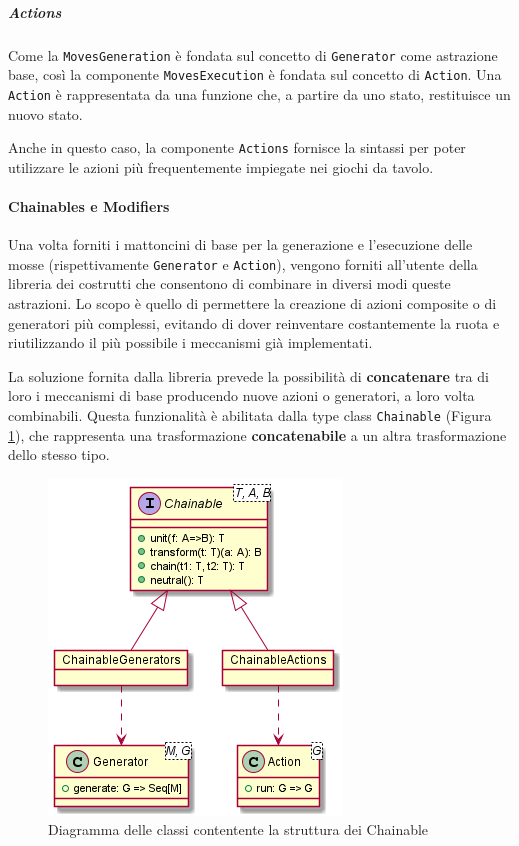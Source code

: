 \subparagraph{Actions}
Come la \texttt{MovesGeneration} è fondata sul concetto di \texttt{Generator} come astrazione base, così la componente \texttt{MovesExecution} è fondata sul concetto di \texttt{Action}.
%
Una \texttt{Action} è rappresentata da una funzione che, a partire da uno stato, restituisce un nuovo stato.

Anche in questo caso, la componente \texttt{Actions} fornisce la sintassi per poter utilizzare le azioni più frequentemente impiegate nei giochi da tavolo.

\paragraph{Chainables e Modifiers}
Una volta forniti i mattoncini di base per la generazione e l'esecuzione delle mosse (rispettivamente \texttt{Generator} e \texttt{Action}), vengono forniti all'utente della libreria dei costrutti che consentono di combinare in diversi modi queste astrazioni.
%
Lo scopo è quello di permettere la creazione di azioni composite o di generatori più complessi, evitando di dover reinventare costantemente la ruota e riutilizzando il più possibile i meccanismi già implementati.

La soluzione fornita dalla libreria prevede la possibilità di \textbf{concatenare} tra di loro i meccanismi di base producendo nuove azioni o generatori, a loro volta combinabili.
%
Questa funzionalità è abilitata dalla type class \texttt{Chainable} (Figura \ref{fig:chainables}), che rappresenta una trasformazione \textbf{concatenabile} a un altra trasformazione dello stesso tipo.
%
\begin{figure}
    \centering
    \includegraphics[width=0.5\linewidth]{images/uml/chainables.png}
    \caption{Diagramma delle classi contentente la struttura dei Chainable}
    \label{fig:chainables}
\end{figure}

